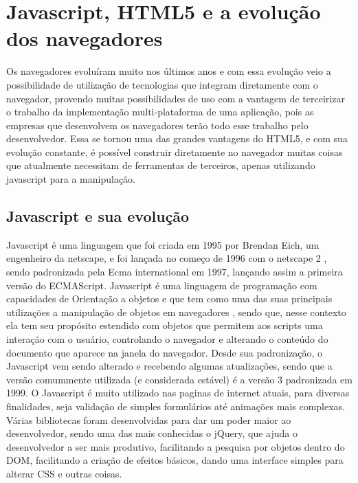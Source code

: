 \section{Javascript, HTML5 e a evolução dos navegadores}


Os navegadores evoluíram muito nos últimos anos e com essa evolução
veio a possibilidade de utilização de tecnologias que integram
diretamente com o navegador, provendo muitas possibilidades de uso com
a vantagem de terceirizar o trabalho da implementação multi-plataforma
de uma aplicação, pois as empresas que desenvolvem os navegadores
terão todo esse trabalho pelo desenvolvedor. Essa se tornou uma das
grandes vantagens do HTML5, e com sua evolução constante, é possível
construir diretamente no navegador muitas coisas que atualmente necessitam
de ferramentas de terceiros, apenas utilizando javascript para a
manipulação.

\subsection{Javascript e sua evolução}

Javascript é uma linguagem que foi criada em 1995 por Brendan Eich,
um engenheiro da netscape, e foi lançada no começo de 1996 com o
netscape 2 \cite{mdnjavascript}, sendo padronizada pela Ecma
international em 1997, lançando assim a primeira versão do ECMAScript.
Javascript é uma linguagem de programação com capacidades de Orientação a objetos e que tem como uma das suas principais
utilizações a manipulação de objetos em navegadores \cite{flanagan2006javascript}, sendo que, nesse contexto
ela tem seu propósito estendido com objetos que permitem aos scripts uma interação com o usuário,
controlando o navegador e alterando o conteúdo do documento que aparece na janela do navegador.
Desde sua padronização, o Javascript vem sendo alterado e
recebendo algumas atualizações, sendo que a versão comummente
utilizada (e considerada estável) é a versão 3 padronizada em 1999.
O Javascript é muito utilizado nas paginas de internet atuais, para
diversas finalidades, seja validação de simples formulários até
animações mais complexas. Várias bibliotecas foram desenvolvidas para
dar um poder maior ao desenvolvedor, sendo uma das mais conhecidas o
jQuery, que ajuda o desenvolvedor a ser mais produtivo, facilitando a
pesquisa por objetos dentro do DOM, facilitando a criação de efeitos
básicos, dando uma interface simples para alterar CSS e outras coisas.


